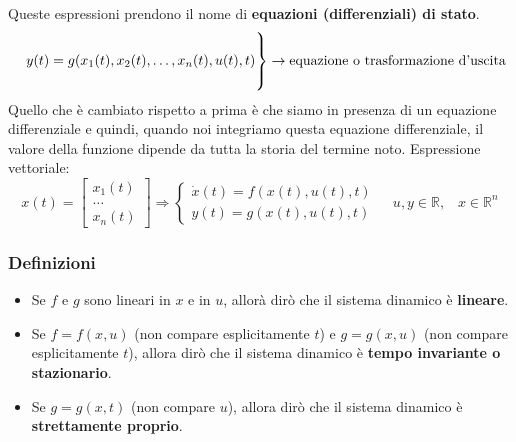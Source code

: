 Queste espressioni prendono il nome di \textbf{equazioni (differenziali) di stato}.
\[
    \begin{rcases}
        \\
        \;\;\;\; y(t) = g(x_1(t),x_2(t), \dots, x_n(t), u(t), t)\\
        \\
    \end{rcases} \rightarrow \text{equazione o trasformazione d'uscita}\;
\]
Quello che è cambiato rispetto a prima è che siamo in presenza di un equazione differenziale e quindi, quando noi integriamo questa equazione differenziale, il valore della funzione dipende da tutta la storia del termine noto.\newline
\newline
Espressione vettoriale:
\[
    x(t) = \left[\begin{matrix}
        x_1(t)\\
        \dots\\
        x_n(t)
    \end{matrix}\right] \Rightarrow  \begin{cases}
        \dot{x}(t) = f(x(t), u(t),t)\\
        y(t) = g(x(t),u(t),t)
    \end{cases} \;\;\;\;u,y \in \mathbb{R}, \;\;\;x \in \mathbb{R}^n
\]
\subsubsection{Definizioni}
\begin{itemize}
    \item Se $f$ e $g$ sono lineari in $x$ e in $u$, allorà dirò che il sistema dinamico è \textbf{lineare}.
    \item Se $f = f(x,u)$ (non compare esplicitamente $t$) e $g = g(x,u)$ (non compare esplicitamente $t$), allora dirò che il sistema dinamico è \textbf{tempo invariante o stazionario}.
    \item Se $g = g(x,t)$ (non compare $u$), allora dirò che il sistema dinamico è \textbf{strettamente proprio}.
\end{itemize}
